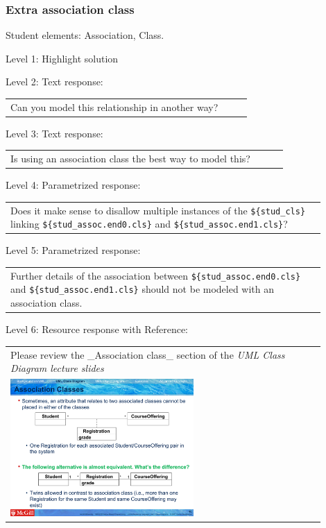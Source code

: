 \subsubsection{Extra association class}

Student elements: Association, Class.  \medskip

\noindent Level 1: Highlight solution  \medskip

\noindent Level 2: Text response: \medskip

\begin{tabular}{|p{0.9\linewidth}}
Can you model this relationship in another way?
\end{tabular} \medskip

\noindent Level 3: Text response: \medskip

\begin{tabular}{|p{0.9\linewidth}}
Is using an association class the best way to model this?
\end{tabular} \medskip

\noindent Level 4: Parametrized response: \medskip

\begin{tabular}{|p{0.9\linewidth}}
Does it make sense to disallow multiple instances of the \verb|${stud_cls}| linking \verb|${stud_assoc.end0.cls}| and \verb|${stud_assoc.end1.cls}|?
\end{tabular} \medskip

\noindent Level 5: Parametrized response: \medskip

\begin{tabular}{|p{0.9\linewidth}}
Further details of the association between \verb|${stud_assoc.end0.cls}| and \verb|${stud_assoc.end1.cls}| should not be modeled with an association class.
\end{tabular} \medskip

\noindent Level 6: Resource response with Reference: \medskip

\begin{tabular}{|p{0.9\linewidth}}
Please review the _Association class_ section of the
\textit{UML Class Diagram lecture slides}

\\
\includegraphics[width=0.6\textwidth]{images/association_class.png}
\end{tabular} \medskip



